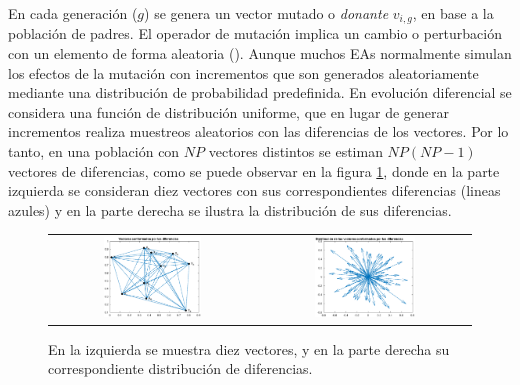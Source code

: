 En cada generación ($g$) se genera un vector mutado o \textit{donante} $v_{i,g}$, en base a la población de padres.
%
El operador de mutación implica un cambio o perturbación con un elemento de forma aleatoria (\cite{price2006differential}).
%
Aunque muchos EAs normalmente simulan los efectos de la mutación con incrementos que son generados aleatoriamente mediante una distribución de probabilidad predefinida.
%
En evolución diferencial se considera una función de distribución uniforme, que en lugar de generar incrementos realiza muestreos aleatorios con las diferencias de los vectores.
%
Por lo tanto, en una población con $NP$ vectores distintos se estiman $NP(NP-1)$ vectores de diferencias, como se puede observar en la figura \ref{fig:Distribucion_Diferencias_Mutacion}, donde en la parte izquierda se consideran diez vectores con sus correspondientes diferencias (lineas azules) y en la parte derecha se ilustra la distribución de sus diferencias.
\begin{figure}%
\centering
\begin{tabular}{cc}
   \includegraphics[width=0.5\textwidth]{Figures_Chapter6/Diferencias_Puntos.eps} &
   \includegraphics[width=0.5\textwidth]{Figures_Chapter6/Distribucion_Mutacion.eps} 
\end{tabular}
\caption{En la izquierda se muestra diez vectores, y en la parte derecha su correspondiente distribución de diferencias.}
\label{fig:Distribucion_Diferencias_Mutacion}
\end{figure}

